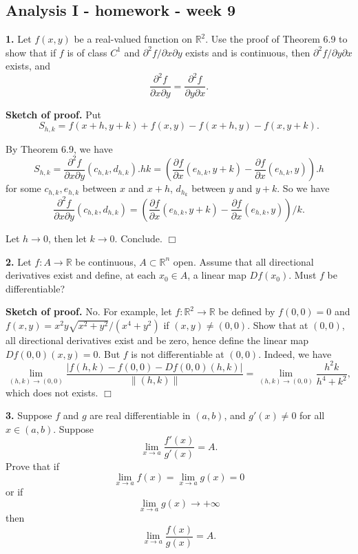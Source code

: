 \documentclass{article}
\begin{document}
    
    
    
    
    

    
    \subsection*{Analysis I - homework - week
9}\label{analysis-i---homework---week-9}

    \textbf{1.} Let $f(x,y)$ be a real-valued function on $\mathbb{R}^2$.
Use the proof of Theorem 6.9 to show that if $f$ is of class $C^1$ and
$\partial^2 f/\partial x \partial y$ exists and is continuous, then
$\partial^2f /\partial y \partial x$ exists, and
\[\frac{\partial^2 f}{\partial x \partial y} = \frac{\partial^2f }{\partial y \partial x}.\]

    \textbf{Sketch of proof.} Put
\[S_{h,k} = f(x+h,y+k) + f(x,y) - f(x+h,y) - f(x,y+k).\]

By Theorem 6.9, we have
\[S_{h,k} = \frac{\partial^2 f}{\partial x \partial y}(c_{h,k},d_{h,k}).hk=\left( \frac{\partial f}{\partial x}(e_{h,k}, y + k) - \frac{\partial f}{\partial x}(e_{h,k}, y )\right).h \]
for some $c_{h,k},e_{h,k}$ between $x$ and $x+h$, $d_{h_k}$ between $y$
and $y+k$. So we have
\[ \frac{\partial^2 f}{\partial x \partial y}(c_{h,k},d_{h,k})=\left( \frac{\partial f}{\partial x}(e_{h,k}, y + k) - \frac{\partial f}{\partial x}(e_{h,k}, y )\right)/k. \]

Let $h \to 0$, then let $k\to 0$. Conclude. $\Box$

    \textbf{2.} Let $f:A\to \mathbb{R}$ be continuous,
$A\subset \mathbb{R}^n$ open. Assume that all directional derivatives
exist and define, at each $x_0\in A$, a linear map $Df(x_0)$. Must $f$
be differentiable?

    \textbf{Sketch of proof.} No. For example, let
$f : \mathbb{R}^2 \to \mathbb{R}$ be defined by $f(0,0) = 0$ and
$f(x,y) = x^2y\sqrt{x^2+y^2}/(x^4+y^2)$ if $(x,y)\ne (0,0)$. Show that
at $(0,0)$, all directional derivatives exist and be zero, hence define
the linear map $Df(0,0) (x,y) = 0$. But $f$ is not differentiable at
$(0,0)$. Indeed, we have
\[\lim_{(h,k)\to (0,0)}\frac{|f(h,k) - f(0,0) - Df(0,0)(h,k)|}{\|(h,k)\|} = \lim_{(h,k)\to (0,0)} \frac{h^2k}{h^4+ k^2},\]
which does not exists. $\Box$

    \textbf{3.} Suppose $f$ and $g$ are real differentiable in $(a,b)$, and
$g'(x) \ne 0$ for all $x\in (a,b)$. Suppose
\[\lim_{x\to a}\frac{f'(x)}{g'(x)} = A.\] Prove that if
\[\tag{*}\lim_{x\to a} f(x) = \lim_{x\to a}g(x) = 0\] or if
\[\tag{**}\lim_{x\to a} g(x) \to +\infty\] then
\[\lim_{x\to a} \frac{f(x)}{g(x)} = A.\]
\end{document}
